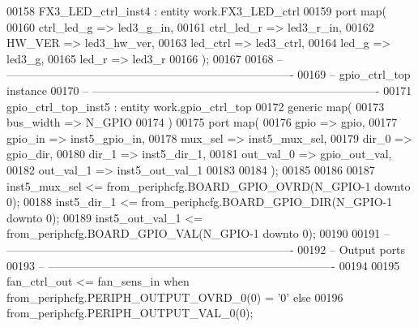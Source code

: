 \begin{DoxyCode}
00158    FX3\_LED\_ctrl\_inst4 : \textcolor{keywordflow}{entity} work.FX3_LED_ctrl
00159       \textcolor{keywordflow}{port} \textcolor{keywordflow}{map}(
00160          ctrl_led_g     => led3_g_in,
00161          ctrl_led_r     => led3_r_in,
00162          HW_VER         => led3_hw_ver,
00163          led_ctrl       => led3_ctrl,
00164          led_g          => led3_g,
00165          led_r          => led3_r
00166       \textcolor{vhdlchar}{)};
00167 
00168 \textcolor{keyword}{-- ----------------------------------------------------------------------------}
00169 \textcolor{keyword}{-- gpio\_ctrl\_top instance}
00170 \textcolor{keyword}{-- ----------------------------------------------------------------------------      }
00171    gpio\_ctrl\_top\_inst5 : \textcolor{keywordflow}{entity} work.gpio_ctrl_top
00172    \textcolor{keywordflow}{generic} \textcolor{keywordflow}{map}(
00173       bus_width   => N_GPIO
00174    \textcolor{vhdlchar}{)}
00175    \textcolor{keywordflow}{port} \textcolor{keywordflow}{map}(
00176       gpio        => gpio,
00177       gpio_in     => inst5_gpio_in,
00178       mux_sel     => inst5_mux_sel,
00179       dir_0       => gpio_dir,
00180       dir_1       => inst5_dir_1,
00181       out_val_0   => gpio_out_val,
00182       out_val_1   => inst5_out_val_1
00183 
00184    \textcolor{vhdlchar}{)};
00185    
00186    
00187    inst5\_mux\_sel   <= from\_periphcfg.BOARD\_GPIO\_OVRD(N\_GPIO-1 \textcolor{keywordflow}{downto} \textcolor{vhdllogic}{0});
00188    inst5\_dir\_1     <= from\_periphcfg.BOARD\_GPIO\_DIR(N\_GPIO-1 \textcolor{keywordflow}{downto} \textcolor{vhdllogic}{0});
00189    inst5\_out\_val\_1 <= from\_periphcfg.BOARD\_GPIO\_VAL(N\_GPIO-1 \textcolor{keywordflow}{downto} \textcolor{vhdllogic}{0});
00190    
00191 \textcolor{keyword}{-- ----------------------------------------------------------------------------}
00192 \textcolor{keyword}{-- Output ports}
00193 \textcolor{keyword}{-- ----------------------------------------------------------------------------      }
00194       
00195    \textcolor{vhdlchar}{fan_ctrl_out}   \textcolor{vhdlchar}{<=} \textcolor{vhdlchar}{fan_sens_in} \textcolor{keywordflow}{when} \textcolor{vhdlchar}{from_periphcfg}\textcolor{vhdlchar}{.}\textcolor{vhdlchar}{PERIPH_OUTPUT_OVRD_0}\textcolor{vhdlchar}{(}\textcolor{vhdllogic}{}\textcolor{vhdllogic}{0}\textcolor{vhdlchar}{)} \textcolor{vhdlchar}{=} \textcolor{vhdlchar}{'}\textcolor{vhdllogic}{}\textcolor{vhdllogic}{0}\textcolor{vhdlchar}{'} \textcolor{keywordflow}{else} 
00196                      \textcolor{vhdlchar}{from_periphcfg}\textcolor{vhdlchar}{.}\textcolor{vhdlchar}{PERIPH_OUTPUT_VAL_0}\textcolor{vhdlchar}{(}\textcolor{vhdllogic}{}\textcolor{vhdllogic}{0}\textcolor{vhdlchar}{)};

\end{DoxyCode}
